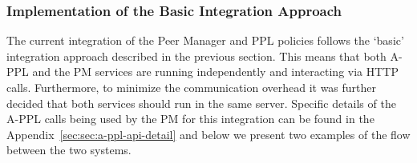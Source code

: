 \subsubsection{Implementation of the Basic Integration Approach}
The current integration of the Peer Manager and PPL policies follows the `basic' integration approach described in the previous section. This means that both A-PPL and the PM services are running independently and interacting via HTTP calls. Furthermore, to minimize the communication overhead it was further decided that both services should run in the same server. 
 Specific details of the A-PPL calls being used by the PM for this integration can be found in the Appendix~\ref{sec:sec:a-ppl-api-detail} and below we present two examples of the flow between the two systems.
